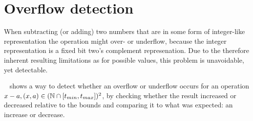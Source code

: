 \section{Overflow detection}\label{sec:basics:overflow}

When subtracting (or adding) two numbers that are in some form of integer-like representation the operation might over- or underflow, because the integer representation is a fixed bit two's complement represenation.
Due to the therefore inherent resulting limitations as for possible values, this problem is unavoidable, yet detectable.

~\cite{pmg_2009} shows a way to detect whether an overflow or underflow occurs for an operation $x - a, (x, a) \in (\mathbb{N} \cap {\lbrack t_{min}, t_{max} \rbrack})^2$, by checking whether the result increased or decreased relative to the bounds and comparing it to what was expected: an increase or decrease.


